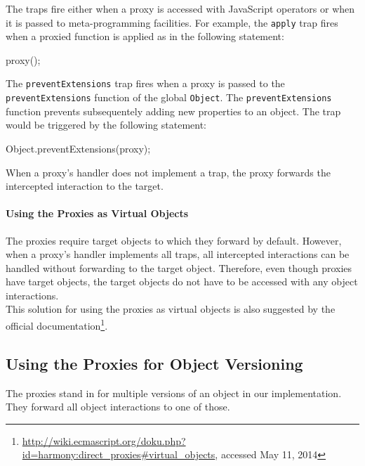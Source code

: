 The traps fire either when a proxy is accessed with JavaScript operators or when it is passed to meta-programming facilities.
For example, the \lstinline{apply} trap fires when a proxied function is applied as in the following statement:

\begin{code}{}{}
proxy();
\end{code}
\iffalse
\end{verbatim}\fi
The \lstinline{preventExtensions} trap fires when a proxy is passed to the \lstinline{preventExtensions} function of the global \lstinline{Object}.
The \lstinline{preventExtensions} function prevents subsequentely adding new properties to an object.
The trap would be triggered by the following statement:

\begin{code}{}{}
Object.preventExtensions(proxy);
\end{code}
\iffalse
\end{verbatim}\fi

When a proxy's handler does not implement a trap, the proxy forwards the intercepted interaction to the target.

\paragraph{Using the Proxies as Virtual Objects}
The proxies require target objects to which they forward by default.
However, when a proxy's handler implements all traps, all intercepted interactions can be handled without forwarding to the target object.
Therefore, even though proxies have target objects, the target objects do not have to be accessed with any object interactions.
\\
This solution for using the proxies as virtual objects is also suggested by the official documentation\footnote{\url{http://wiki.ecmascript.org/doku.php?id=harmony:direct\_proxies\#virtual_objects}, accessed May 11, 2014}.



\subsection{Using the Proxies for Object Versioning} \label{subsec:IMPLEMENTATION:1.2}

The proxies stand in for multiple versions of an object in our implementation.
They forward all object interactions to one of those.

